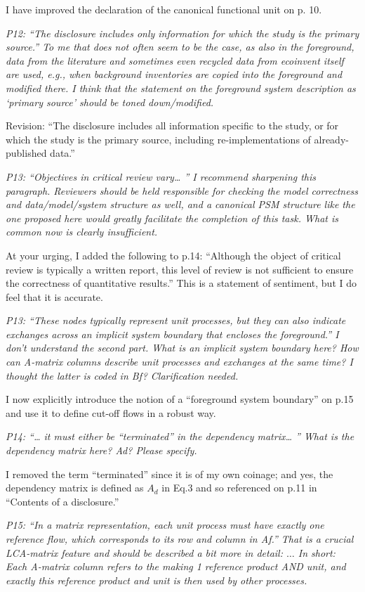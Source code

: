 \documentclass[11pt,letterpaper]{article}
\begin{document}
I have improved the declaration of the canonical functional unit on p. 10.

\emph{P12: “The disclosure includes only information for which the study is the primary source.” To me that does not often seem to be the case, as also in the foreground, data from the literature and sometimes even recycled data from ecoinvent itself are used, e.g., when background inventories are copied into the foreground and modified there.
  I think that the statement on the foreground system description as ‘primary source’ should be toned down/modified.}

Revision: ``The disclosure includes all information specific to the study, or for which the study is the primary source, including re-implementations of already-published data.''

\emph{P13: “Objectives in critical review vary… ” I recommend sharpening this paragraph. Reviewers should be held responsible for checking the model correctness and data/model/system structure as well, and a canonical PSM structure like the one proposed here would greatly facilitate the completion of this task. What is common now is clearly insufficient.}

At your urging, I added the following to p.14: ``Although the object of critical review is typically a written report, this level of review is not sufficient to ensure the correctness of quantitative results.''  This is a statement of sentiment, but I do feel that it is accurate.

\emph{P13: “These nodes typically represent unit processes, but they can also indicate exchanges across an implicit system boundary that encloses the foreground.” I don’t understand the second part. What is an implicit system boundary here? How can A-matrix columns describe unit processes and exchanges at the same time? I thought the latter is coded in Bf? Clarification needed.}

I now explicitly introduce the notion of a ``foreground system boundary'' on p.15 and use it to define cut-off flows in a robust way.

\emph{P14: “… it must either be “terminated” in the dependency matrix… ” What is the dependency matrix here? Ad? Please specify.}

I removed the term ``terminated'' since it is of my own coinage; and yes, the dependency matrix is defined as $A_d$ in Eq.3 and so referenced on p.11 in ``Contents of a disclosure.''

\emph{P15: “In a matrix representation, each unit process must have exactly one reference flow, which
  corresponds to its row and column in Af.” That is a crucial LCA-matrix feature and should be described a bit more in detail: $\ldots$ In short: Each A-matrix column refers to the making 1 reference product AND unit, and exactly this reference product and unit is then used by other processes.}
\end{document}
